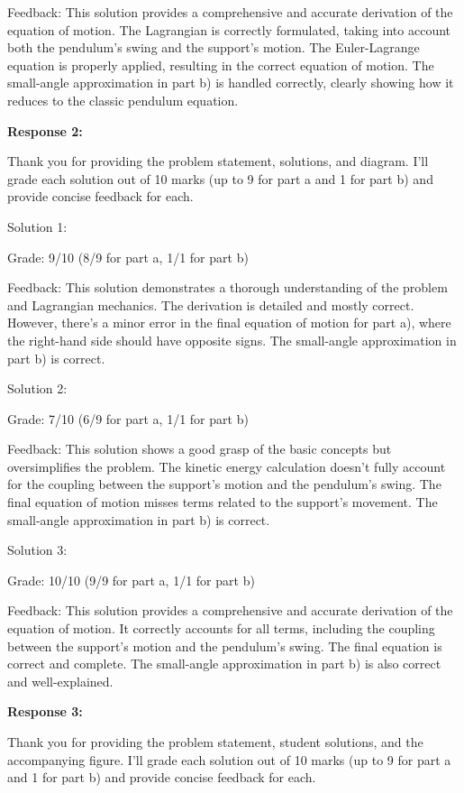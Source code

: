 \documentclass[a4paper,11pt]{article}
\begin{document}
Feedback: This solution provides a comprehensive and accurate derivation of the equation of motion. The Lagrangian is correctly formulated, taking into account both the pendulum's swing and the support's motion. The Euler-Lagrange equation is properly applied, resulting in the correct equation of motion. The small-angle approximation in part b) is handled correctly, clearly showing how it reduces to the classic pendulum equation.

\bigskip
\textbf{Response 2:}

Thank you for providing the problem statement, solutions, and diagram. I'll grade each solution out of 10 marks (up to 9 for part a and 1 for part b) and provide concise feedback for each.

Solution 1:

Grade: 9/10 (8/9 for part a, 1/1 for part b)

Feedback: This solution demonstrates a thorough understanding of the problem and Lagrangian mechanics. The derivation is detailed and mostly correct. However, there's a minor error in the final equation of motion for part a), where the right-hand side should have opposite signs. The small-angle approximation in part b) is correct.

Solution 2:

Grade: 7/10 (6/9 for part a, 1/1 for part b)

Feedback: This solution shows a good grasp of the basic concepts but oversimplifies the problem. The kinetic energy calculation doesn't fully account for the coupling between the support's motion and the pendulum's swing. The final equation of motion misses terms related to the support's movement. The small-angle approximation in part b) is correct.

Solution 3:

Grade: 10/10 (9/9 for part a, 1/1 for part b)

Feedback: This solution provides a comprehensive and accurate derivation of the equation of motion. It correctly accounts for all terms, including the coupling between the support's motion and the pendulum's swing. The final equation is correct and complete. The small-angle approximation in part b) is also correct and well-explained.

\bigskip
\textbf{Response 3:}

Thank you for providing the problem statement, student solutions, and the accompanying figure. I'll grade each solution out of 10 marks (up to 9 for part a and 1 for part b) and provide concise feedback for each.
\end{document}
